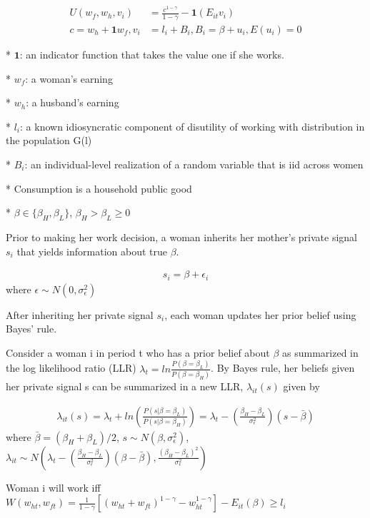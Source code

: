 \documentclass[titlepage]{\econtex}
\begin{document}
\begin{align*}
U(w_{f}, w_{h}, v_{i})&=\frac{c^{1-\gamma}}{1-\gamma}-\textbf{1} (E_{i t}v_i)\\
c = w_h + \textbf{1} w_f,   v_i &=l_i + B_i , B_i = \beta + u_i , E(u_i)=0
\end{align*}

* $\textbf{1}$: an indicator function that takes the value one if she works.

* $w_f$: a woman's earning

* $w_h$: a husband's earning

* $l_i$: a known idiosyncratic component of disutility of working with distribution in the population G(l)

* $B_i$: an individual-level realization of a random variable that is iid across women

* Consumption is a household public good

* $\beta \in \{\beta_H, \beta_L\}$, $\beta_H >\beta_L \geq 0$

Prior to making her work decision, a woman inherits her mother's private signal $s_i$ that yields information about true $\beta$.

\begin{align*}
s_i = \beta + \epsilon_i
\end{align*}
where $\epsilon \sim N(0,\sigma_{\epsilon}^2)$

After inheriting her private signal $s_i$, each woman updates her prior belief using Bayes' rule.

Consider a woman i in period t who has a prior belief about $\beta$ as summarized in the log likelihood ratio (LLR) $\lambda_t = ln \frac{P(\beta=\beta_L)}{P(\beta=\beta_H)}$. By Bayes rule, her beliefs given her private signal s can be summarized in a new LLR, $\lambda_{i t}(s)$ given by

\begin{align*}
\lambda_{i t}(s)=\lambda_t + ln(\frac{P(s|\beta=\beta_L)}{P(s|\beta=\beta_H)})=\lambda_t - (\frac{\beta_H - \beta_L}{\sigma_{\epsilon}^2})(s-\bar{\beta})
\end{align*}
where $\bar{\beta}=(\beta_H+\beta_L)/2$, $s \sim N(\beta, \sigma_{\epsilon}^2)$, $\lambda_{it} \sim N(\lambda_t - (\frac{\beta_H-\beta_L}{\sigma_{\epsilon}^2})(\beta - \bar{\beta}), \frac{(\beta_H-\beta_L)^2}{\sigma_{\epsilon}^2})$

Woman i will work iff $W(w_{h t}, w_{f t})=\frac{1}{1-\gamma}[(w_{h t}+w_{f t})^{1-\gamma} - w_{h t}^{1-\gamma} ] - E_{i t}(\beta) \geq l_i$
\end{document}
